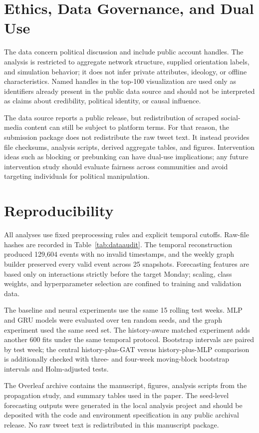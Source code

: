 \documentclass[11pt,a4paper]{article}
\begin{document}
\section{Ethics, Data Governance, and Dual Use}
The data concern political discussion and include public account handles. The analysis is restricted to aggregate network structure, supplied orientation labels, and simulation behavior; it does not infer private attributes, ideology, or offline characteristics. Named handles in the top-100 visualization are used only as identifiers already present in the public data source and should not be interpreted as claims about credibility, political identity, or causal influence.

The data source reports a public release, but redistribution of scraped social-media content can still be subject to platform terms. For that reason, the submission package does not redistribute the raw tweet text. It instead provides file checksums, analysis scripts, derived aggregate tables, and figures. Intervention ideas such as blocking or prebunking can have dual-use implications; any future intervention study should evaluate fairness across communities and avoid targeting individuals for political manipulation.

\section{Reproducibility}
All analyses use fixed preprocessing rules and explicit temporal cutoffs. Raw-file hashes are recorded in Table~\ref{tab:dataaudit}. The temporal reconstruction produced 129,604 events with no invalid timestamps, and the weekly graph builder preserved every valid event across 25 snapshots. Forecasting features are based only on interactions strictly before the target Monday; scaling, class weights, and hyperparameter selection are confined to training and validation data.

The baseline and neural experiments use the same 15 rolling test weeks. MLP and GRU models were evaluated over ten random seeds, and the graph experiment used the same seed set. The history-aware matched experiment adds another 600 fits under the same temporal protocol. Bootstrap intervals are paired by test week; the central history-plus-GAT versus history-plus-MLP comparison is additionally checked with three- and four-week moving-block bootstrap intervals and Holm-adjusted tests.

The Overleaf archive contains the manuscript, figures, analysis scripts from the propagation study, and summary tables used in the paper. The seed-level forecasting outputs were generated in the local analysis project and should be deposited with the code and environment specification in any public archival release. No raw tweet text is redistributed in this manuscript package.
\end{document}
